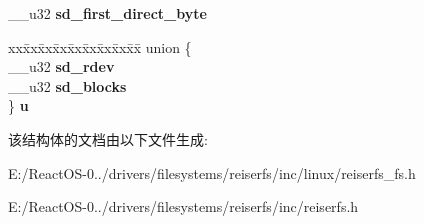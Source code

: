 \begin{DoxyCompactItemize}
\begin{tabbing}
\end{tabbing}\item 
\mbox{\label{structstat__data__v1_a961a61285c36a074eecf61ef53e8e872}} 
\+\_\+\+\_\+u32 {\bfseries sd\+\_\+first\+\_\+direct\+\_\+byte}
\item 
\mbox{\label{structstat__data__v1_ad8e08887a3ef0a689ea4b22d62f82b2c}} 
\begin{tabbing}
xx\=xx\=xx\=xx\=xx\=xx\=xx\=xx\=xx\=\kill
union \{\\
\>\_\_u32 {\bfseries sd\_rdev}\\
\>\_\_u32 {\bfseries sd\_blocks}\\
\} {\bfseries u}\\

\end{tabbing}\end{DoxyCompactItemize}


该结构体的文档由以下文件生成\+:\begin{DoxyCompactItemize}
\item 
E\+:/\+React\+O\+S-\/0../drivers/filesystems/reiserfs/inc/linux/reiserfs\+\_\+fs.\+h\item 
E\+:/\+React\+O\+S-\/0../drivers/filesystems/reiserfs/inc/reiserfs.\+h\end{DoxyCompactItemize}
